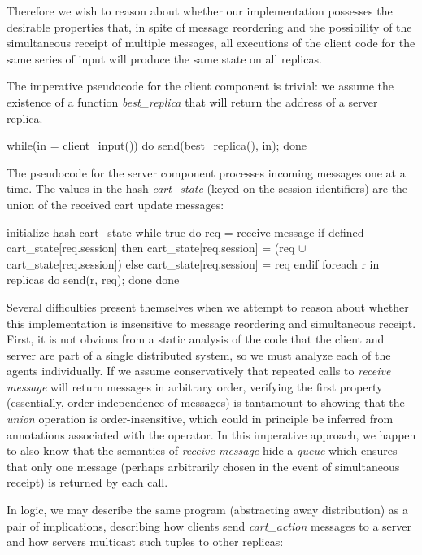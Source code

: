 Therefore we wish to reason about whether our implementation possesses the desirable 
properties that, in spite of message reordering and the possibility of the simultaneous
receipt of multiple messages, all executions of the client code for the same series of
input will produce the same state on all replicas.  

The imperative pseudocode for the client component is trivial: we assume the existence
of a function {\em best\_replica} that will return the address of a server replica.

\begin{Dedalus}
while(in = client_input()) do
  send(best_replica(), in);
done
\end{Dedalus}


The pseudocode for the server component processes incoming messages one
at a time.  The values in the hash {\em cart\_state} (keyed on the session identifiers) 
are the union of the received cart update messages:

\begin{Dedalus}
initialize hash cart_state
while true do
  req = receive message
  if defined cart_state[req.session] then
     cart_state[req.session] =  
       (req \(\cup\) cart_state[req.session]) 
  else 
    cart_state[req.session] = { req } 
  endif
  foreach r in replicas do
    send(r, req);
  done
done
\end{Dedalus}


Several difficulties present themselves when we attempt to reason about whether
this implementation is insensitive to message reordering and simultaneous receipt.
First, it is not obvious from a static analysis of the code that the client and server are
part of a single distributed system, so we must analyze each of the agents individually.
If we assume conservatively that repeated calls to {\em receive message} will return messages in
arbitrary order, verifying the first property (essentially, order-independence of messages)
is tantamount to showing that the {\em union} operation is
order-insensitive, which could in principle be inferred from annotations associated
with the operator.
In this imperative approach, we happen to also know that the semantics of {\em receive message}
hide a {\em queue} which ensures that only one message (perhaps arbitrarily chosen in the
event of simultaneous receipt) is returned by each call.


In logic, we may describe the same program (abstracting away distribution)
as a pair of implications, describing how clients send {\em cart\_action}
messages to a server and how servers multicast such tuples to other replicas:

